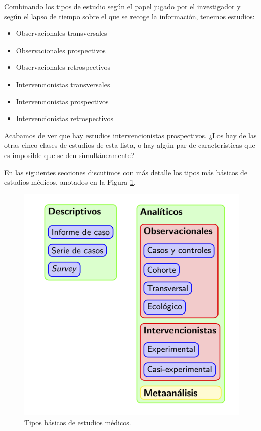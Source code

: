 \documentclass[
]{book}
\providecommand{\tightlist}{%
  \setlength{\itemsep}{0pt}\setlength{\parskip}{0pt}}
\theoremstyle{definition}
\theoremstyle{definition}
\theoremstyle{definition}
\theoremstyle{definition}
\theoremstyle{remark}
\begin{document}
\begin{rmdexercici}
Combinando los tipos de estudio según el papel jugado por el investigador y según el lapso de tiempo sobre el que se recoge la información, tenemos estudios:

\begin{itemize}
\tightlist
\item
  Observacionales transversales
\item
  Observacionales prospectivos
\item
  Observacionales retrospectivos
\item
  Intervencionistas transversales
\item
  Intervencionistas prospectivos
\item
  Intervencionistas retrospectivos
\end{itemize}

Acabamos de ver que hay estudios intervencionistas prospectivos. ¿Los hay de las otras cinco clases de estudios de esta lista, o hay algún par de características que es imposible que se den simultáneamente?
\end{rmdexercici}

En las siguientes secciones discutimos con más detalle los tipos más básicos de estudios médicos, anotados en la Figura \ref{fig:estudisgraf}.

\begin{figure}

{\centering \includegraphics[width=0.8\linewidth]{INREMDN_files/figure-html/estudis} 

}

\caption{Tipos básicos de estudios médicos.}\label{fig:estudisgraf}
\end{figure}
\end{document}
